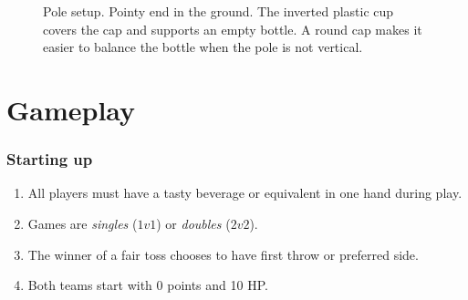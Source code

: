 \documentclass[11pt,letterpaper,twocolumn,english,DIV=calc]{scrartcl}
\begin{document}
\begin{figure}[!h]
	\begin{centering}
		\vspace{-5mm}\par
	\end{centering}
	\caption{
		Pole setup. 
		Pointy end in the ground. 
		The inverted plastic cup covers the cap and supports an empty bottle. 
		A round cap makes it easier to balance the bottle when the pole is not vertical.\label{fig:pole-setup}
	}
\end{figure}


\part*{Gameplay}

\section{Starting up}
\begin{enumerate}
	\item All players must have a tasty beverage or equivalent in one hand during play.
	\item Games are \emph{singles} ($1v1$) or \emph{doubles} ($2v2$).
	\item The winner of a fair toss chooses to have first throw or preferred side.
	\item Both teams start with 0 points and 10 HP.
\end{enumerate}
\end{document}
